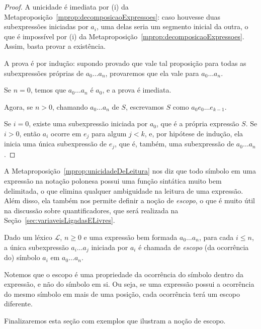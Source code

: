 \begin{proof}

    A unicidade é imediata por (i) da Metaproposição~\ref{mprop:decomposicaoExpressoes}: caso houvesse duas subexpressões iniciadas por $a_i$, uma delas seria um segmento inicial da outra, o que é impossível por (i) da Metaproposição~\ref{mprop:decomposicaoExpressoes}.
    Assim, basta provar a existência.

    A prova é por indução: supondo provado que vale tal proposição para todas as subexpressões próprias de $a_0\dots a_n$, provaremos que ela vale para $a_0\dots a_n$.

    Se $n=0$, temos que $a_0\dots a_n$ é $a_0$, e a prova é imediata.

    Agora, se $n>0$, chamando $a_0\dots a_n$ de $S$, escrevamos $S$ como $a_0e_0\dots e_{k-1}$.

    Se $i=0$, existe uma subexpressão iniciada por $a_0$, que é a própria expressão $S$.
    Se $i>0$, então $a_i$ ocorre em $e_j$ para algum $j<k$, e, por hipótese de indução, ela inicia uma única subexpressão de $e_j$, que é, também, uma subexpressão de $a_0\dots a_n$.
\end{proof}

A Metaproposição~\ref{mprop:unicidadeDeLeitura} nos diz que todo símbolo em uma expressão na notação polonesa possui uma função sintática muito bem delimitada, o que elimina qualquer ambiguidade na leitura de uma expressão.
Além disso, ela também nos permite definir a noção de \emph{escopo}, o que é muito útil na discussão sobre quantificadores, que será realizada na Seção~\ref{sec:variaveisLigadasELivres}.

\begin{metadefinition}\label{mdef:escopo}
Dado um léxico $\mathcal L$, $n\geq 0$ e uma expressão bem formada $a_0\dots a_n$, para cada $i\leq n$, a única subexpressão $a_i\dots a_j$ iniciada por $a_i$ é chamada de \emph{escopo} (da ocorrência do) símbolo $a_i$ em $a_0\dots a_n$.
\end{metadefinition}

Notemos que o escopo é uma propriedade da ocorrência do símbolo dentro da expressão, e não do símbolo em si.
Ou seja, se uma expressão possui a ocorrência do mesmo símbolo em mais de uma posição, cada ocorrência terá um escopo diferente.

Finalizaremos esta seção com exemplos que ilustram a noção de escopo.

